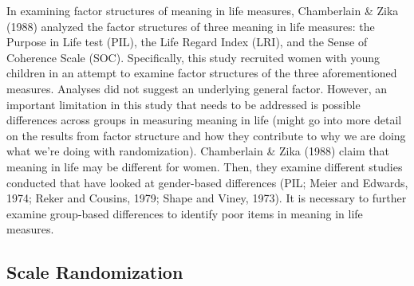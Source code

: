 \documentclass[man,draftall]{apa6}
\begin{document}
In examining factor structures of meaning in life measures, Chamberlain \& Zika (1988) analyzed the factor structures of three meaning in life measures: the Purpose in Life test (PIL), the Life Regard Index (LRI), and the Sense of Coherence Scale (SOC). Specifically, this study recruited women with young children in an attempt to examine factor structures of the three aforementioned measures. Analyses did not suggest an underlying general factor. However, an important limitation in this study that needs to be addressed is possible differences across groups in measuring meaning in life (might go into more detail on the results from factor structure and how they contribute to why we are doing what we're doing with randomization). Chamberlain \& Zika (1988) claim that meaning in life may be different for women. Then, they examine different studies conducted that have looked at gender-based differences (PIL; Meier and Edwards, 1974; Reker and Cousins, 1979; Shape and Viney, 1973). It is necessary to further examine group-based differences to identify poor items in meaning in life measures.

\hypertarget{scale-randomization}{%
\subsection{Scale Randomization}\label{scale-randomization}}
\end{document}
